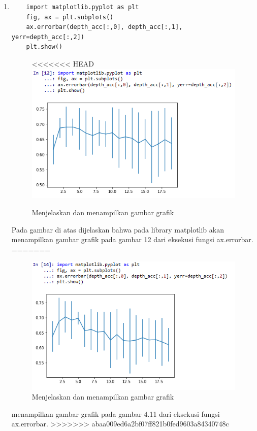 \begin{enumerate}
\item 
\begin{verbatim}
	import matplotlib.pyplot as plt
	fig, ax = plt.subplots()
	ax.errorbar(depth_acc[:,0], depth_acc[:,1], yerr=depth_acc[:,2])
	plt.show()
\end{verbatim}
\begin{figure}[ht]
\centering
<<<<<<< HEAD
\includegraphics[scale=0.5]{figures/lontong/12.png}
\caption{Menjelaskan dan menampilkan gambar grafik}
\end{figure}
\par
	Pada gambar di atas dijelaskan bahwa pada library matplotlib akan menampilkan gambar grafik pada gambar 12 dari eksekusi fungsi ax.errorbar.
=======
\begin{figure}[ht]
\centering
\includegraphics[scale=0.5]{figures/411.png}
\caption{Menjelaskan dan menampilkan gambar grafik}
\end{figure}
\par
	menampilkan gambar grafik pada gambar 4.11 dari eksekusi fungsi ax.errorbar.
>>>>>>> abaa009ed6a2bf07ff821b0fed9603a84340748c

\end{enumerate}


